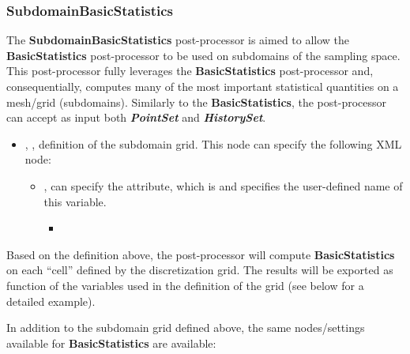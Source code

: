 \subsubsection{SubdomainBasicStatistics}
\label{SubdomainBasicStatistics}
The \textbf{SubdomainBasicStatistics} post-processor is aimed to allow the \textbf{BasicStatistics}
post-processor to be used on subdomains of the sampling space. This post-processor fully leverages
the \textbf{BasicStatistics} post-processor and, consequentially, computes many of the most important statistical quantities on 
a mesh/grid (subdomains). 
Similarly to the \textbf{BasicStatistics}, the post-processor can accept as input both \textit{\textbf{PointSet}} 
and \textit{\textbf{HistorySet}}.


\begin{itemize}
  \item {}, , definition of the subdomain grid. This node
  can specify the following XML node:
  \begin{itemize}
    \item {},  can specify the  attribute, which is  and specifies the user-defined name of this variable.
    \variableChildrenIntro
    \begin{itemize}
     \item \gridDescriptionNoCFD
    \end{itemize}
  \end{itemize}
\end{itemize}

Based on the definition above, the post-processor will compute \textbf{BasicStatistics} on each ``cell'' defined
by the discretization grid. The results will be exported as function of the variables used
in the definition of the grid (see below for a detailed example).

In addition to the subdomain grid defined above, the same nodes/settings available for \textbf{BasicStatistics}
are available:

\basicStatisticsBody

